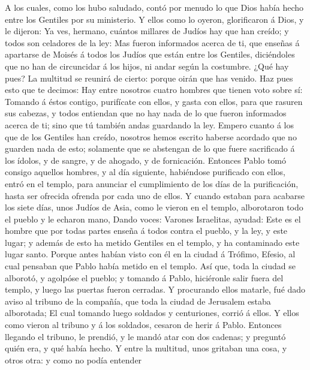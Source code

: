  A los cuales, como los hubo saludado, contó por menudo
lo que Dios había hecho entre los Gentiles por su ministerio.
 Y ellos como lo oyeron, glorificaron á Dios, y le
dijeron: Ya ves, hermano, cuántos millares de Judíos hay que han creído;
y todos son celadores de la ley:  Mas fueron informados
acerca de ti, que enseñas á apartarse de Moisés á todos los Judíos que
están entre los Gentiles, diciéndoles que no han de circuncidar á los
hijos, ni andar según la costumbre.  ¿Qué hay pues? La
multitud se reunirá de cierto: porque oirán que has venido.
 Haz pues esto que te decimos: Hay entre nosotros cuatro
hombres que tienen voto sobre sí:  Tomando á éstos
contigo, purifícate con ellos, y gasta con ellos, para que rasuren sus
cabezas, y todos entiendan que no hay nada de lo que fueron informados
acerca de ti; sino que tú también andas guardando la ley.
 Empero cuanto á los que de los Gentiles han creído,
nosotros hemos escrito haberse acordado que no guarden nada de esto;
solamente que se abstengan de lo que fuere sacrificado á los ídolos, y
de sangre, y de ahogado, y de fornicación.  Entonces
Pablo tomó consigo aquellos hombres, y al día siguiente, habiéndose
purificado con ellos, entró en el templo, para anunciar el cumplimiento
de los días de la purificación, hasta ser ofrecida ofrenda por cada uno
de ellos.  Y cuando estaban para acabarse los siete días,
unos Judíos de Asia, como le vieron en el templo, alborotaron todo el
pueblo y le echaron mano,  Dando voces: Varones
Israelitas, ayudad: Este es el hombre que por todas partes enseña á
todos contra el pueblo, y la ley, y este lugar; y además de esto ha
metido Gentiles en el templo, y ha contaminado este lugar santo.
 Porque antes habían visto con él en la ciudad á Trófimo,
Efesio, al cual pensaban que Pablo había metido en el templo.
 Así que, toda la ciudad se alborotó, y agolpóse el
pueblo; y tomando á Pablo, hiciéronle salir fuera del templo, y luego
las puertas fueron cerradas.  Y procurando ellos matarle,
fué dado aviso al tribuno de la compañía, que toda la ciudad de
Jerusalem estaba alborotada;  El cual tomando luego
soldados y centuriones, corrió á ellos. Y ellos como vieron al tribuno y
á los soldados, cesaron de herir á Pablo.  Entonces
llegando el tribuno, le prendió, y le mandó atar con dos cadenas; y
preguntó quién era, y qué había hecho.  Y entre la
multitud, unos gritaban una cosa, y otros otra: y como no podía entender
